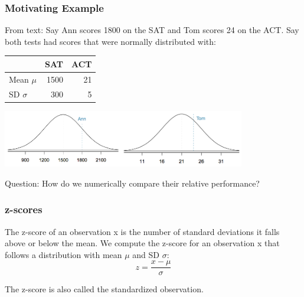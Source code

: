 \documentclass[slides]{beamer}
\newcommand{\blue}[1]{\textcolor{blue2}{#1}}
\begin{document}
\begin{frame}
\frametitle{Motivating Example}
From text:  Say Ann scores 1800 on the SAT and Tom scores 24 on the ACT.  \pause Say both tests had scores that were normally distributed with:
\begin{small}
\begin{center}
\begin{tabular}{l|rr}
& SAT & ACT \\
\hline
Mean $\mu$ & 1500 & 21\\
SD $\sigma$ & 300 & 5\\
\end{tabular}
\end{center}
\end{small}

\begin{center}
\includegraphics[height=2.5cm]{figure/ann.png}\includegraphics[height=2.5cm]{figure/tom.png}
\end{center}

\pause\blue{Question}:  How do we numerically compare their relative performance?  
\end{frame}



\begin{frame}
\frametitle{z-scores}
The \blue{z-score} of an observation x is the number of standard deviations it falls above or below the mean. We compute the z-score for an observation x that follows a distribution with mean $\mu$ and SD $\sigma$:
\[
z = \frac{x-\mu}{\sigma}
\]

\vspace{0.5cm}

\pause The z-score is also called the \blue{standardized observation}.
\end{frame}
\end{document}
